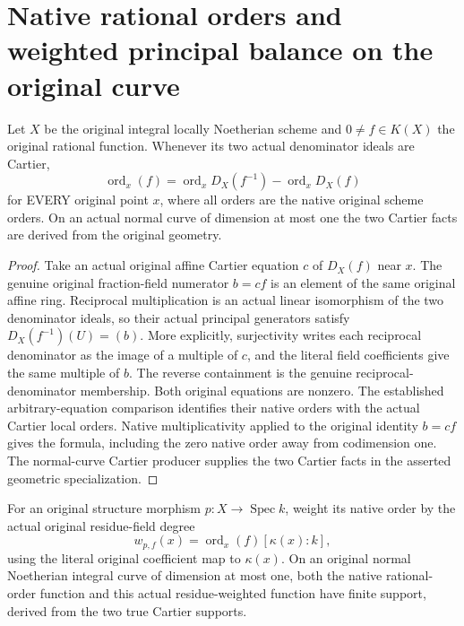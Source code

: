 \section{Native rational orders and weighted principal balance on the original curve}

\begin{theorem}
\label{thm:fc-original-rational-denominator-orders}
\leanok
{}
Let $X$ be the original integral locally Noetherian scheme and
$0\ne f\in K(X)$ the original rational function. Whenever its two
actual denominator ideals are Cartier,
\[
 \operatorname{ord}_x(f)
 =\operatorname{ord}_x D_X(f^{-1})-\operatorname{ord}_x D_X(f)
\]
for EVERY original point $x$, where all orders are the native original
scheme orders. On an actual normal curve of dimension at most one the
two Cartier facts are derived from the original geometry.
\end{theorem}
\begin{proof}
Take an actual original affine Cartier equation $c$ of $D_X(f)$ near $x$.
The genuine original fraction-field numerator $b=cf$ is an element of
the same original affine ring. Reciprocal multiplication is an actual
linear isomorphism of the two denominator ideals, so their actual
principal generators satisfy $D_X(f^{-1})(U)=(b)$. More explicitly,
surjectivity writes each reciprocal denominator as the image of a multiple
of $c$, and the literal field coefficients give the same multiple of $b$.
The reverse containment is the genuine reciprocal-denominator membership.
Both original equations are nonzero. The established arbitrary-equation
comparison identifies their native orders with the actual Cartier local
orders. Native multiplicativity applied to the original identity $b=cf$
gives the formula, including the zero native order away from codimension
one. The normal-curve Cartier producer supplies the two Cartier facts in
the asserted geometric specialization.
\end{proof}

\begin{definition}
\label{def:fc-original-weighted-rational-order}
\leanok
{}
For an original structure morphism $p:X\to\operatorname{Spec}k$, weight
its native order by the actual original residue-field degree
\[
 w_{p,f}(x)=\operatorname{ord}_x(f)[\kappa(x):k],
\]
using the literal original coefficient map to $\kappa(x)$.
On an original normal Noetherian integral curve of dimension at most one,
both the native rational-order function and this actual residue-weighted
function have finite support, derived from the two true Cartier supports.
\end{definition}


